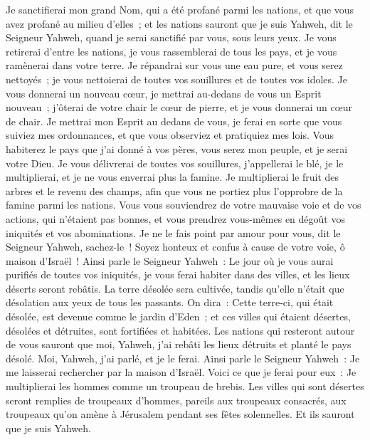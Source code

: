 \begin{multicols}{2}
Je sanctifierai mon grand Nom, qui a été profané parmi les nations, et que vous avez profané au milieu d'elles~; et les nations sauront que je suis Yahweh, dit le Seigneur Yahweh, quand je serai sanctifié par vous, sous leurs yeux.
Je vous retirerai d'entre les nations, je vous rassemblerai de tous les pays, et je vous ramènerai dans votre terre.
Je répandrai sur vous une eau pure, et vous serez nettoyés~; je vous nettoierai de toutes vos souillures et de toutes vos idoles.
Je vous donnerai un nouveau cœur, je mettrai au-dedans de vous un Esprit nouveau~; j'ôterai de votre chair le cœur de pierre, et je vous donnerai un cœur de chair.
Je mettrai mon Esprit au dedans de vous, je ferai en sorte que vous suiviez mes ordonnances, et que vous observiez et pratiquiez mes lois.
Vous habiterez le pays que j'ai donné à vos pères, vous serez mon peuple, et je serai votre Dieu.
Je vous délivrerai de toutes vos souillures, j'appellerai le blé, je le multiplierai, et je ne vous enverrai plus la famine.
Je multiplierai le fruit des arbres et le revenu des champs, afin que vous ne portiez plus l'opprobre de la famine parmi les nations.
Vous vous souviendrez de votre mauvaise voie et de vos actions, qui n'étaient pas bonnes, et vous prendrez vous-mêmes en dégoût vos iniquités et vos abominations.
Je ne le fais point par amour pour vous, dit le Seigneur Yahweh, sachez-le~! Soyez honteux et confus à cause de votre voie, ô maison d'Israël~!
Ainsi parle le Seigneur Yahweh~: Le jour où je vous aurai purifiés de toutes vos iniquités, je vous ferai habiter dans des villes, et les lieux déserts seront rebâtis.
La terre désolée sera cultivée, tandis qu'elle n'était que désolation aux yeux de tous les passants.
On dira~: Cette terre-ci, qui était désolée, est devenue comme le jardin d'Eden~; et ces villes qui étaient désertes, désolées et détruites, sont fortifiées et habitées.
Les nations qui resteront autour de vous sauront que moi, Yahweh, j'ai rebâti les lieux détruits et planté le pays désolé. Moi, Yahweh, j'ai parlé, et je le ferai.
Ainsi parle le Seigneur Yahweh~: Je me laisserai rechercher par la maison d'Israël. Voici ce que je ferai pour eux~: Je multiplierai les hommes comme un troupeau de brebis.
Les villes qui sont désertes seront remplies de troupeaux d'hommes, pareils aux troupeaux consacrés, aux troupeaux qu'on amène à Jérusalem pendant ses fêtes solennelles. Et ils sauront que je suis Yahweh.

\end{multicols}
